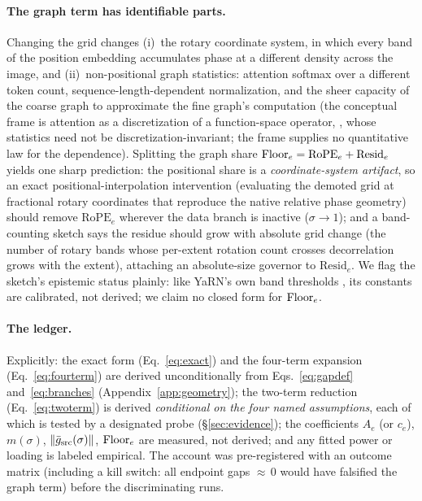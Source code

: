 \paragraph{The graph term has identifiable parts.}
Changing the grid changes (i)~the rotary coordinate system, in which
every band of the position embedding accumulates phase at a different
density across the image, and (ii)~non-positional graph statistics: attention
softmax over a different token count, sequence-length-dependent
normalization, and the sheer capacity of the coarse graph to approximate
the fine graph's computation (the conceptual frame is attention as a
discretization of a function-space operator,
\citealp{calvello2024continuum}, whose statistics need not be
discretization-invariant; the frame supplies no quantitative law for
the dependence). Splitting the graph share
$\mathrm{Floor}_e = \mathrm{RoPE}_e + \mathrm{Resid}_e$ yields one sharp
prediction: the positional share is a \emph{coordinate-system artifact},
so an exact positional-interpolation intervention (evaluating the
demoted grid at fractional rotary coordinates that reproduce the native
relative phase geometry) should remove $\mathrm{RoPE}_e$ wherever the
data branch is inactive ($\sigma \to 1$); and a band-counting sketch
says the residue should grow with absolute grid change (the number of
rotary bands whose per-extent rotation count crosses decorrelation grows
with the extent), attaching an absolute-size governor to
$\mathrm{Resid}_e$. We flag the sketch's epistemic status plainly: like
YaRN's own band thresholds \citep{peng2024yarn}, its constants are
calibrated, not derived; we claim no closed form for $\mathrm{Floor}_e$.

\paragraph{The ledger.}
Explicitly: the exact form (Eq.~\ref{eq:exact}) and the four-term
expansion (Eq.~\ref{eq:fourterm}) are derived unconditionally from
Eqs.~\ref{eq:gapdef} and~\ref{eq:branches}
(Appendix~\ref{app:geometry}); the two-term reduction
(Eq.~\ref{eq:twoterm}) is derived \emph{conditional on the four named
assumptions}, each of which is tested by a designated probe
(\S\ref{sec:evidence}); the
coefficients $A_e$ (or $c_e$), $m(\sigma)$, $\|\bar g_{\mathrm{src}}(\sigma)\|$, $\mathrm{Floor}_e$ are
measured, not derived; and any fitted power or loading is labeled
empirical. The account was
pre-registered with an outcome matrix (including a kill switch: all
endpoint gaps ${\approx}\,0$ would have falsified the graph term) before
the discriminating runs.

